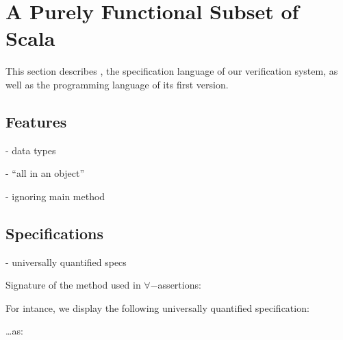 \section{A Purely Functional Subset of Scala}
This section describes \purescala, the specification language of our
verification system, as well as the programming language of its first version.

\subsection{Features}
- data types

- ``all in an object''

- ignoring main method

\subsection{Specifications}
- universally quantified specs

Signature of the method used in $\forall-$assertions:



For intance, we display the following universally quantified specification:



\ldots as:



